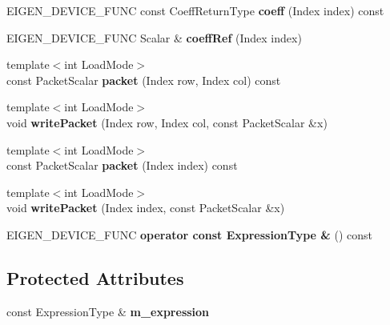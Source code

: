 \begin{DoxyCompactItemize}
E\+I\+G\+E\+N\+\_\+\+D\+E\+V\+I\+C\+E\+\_\+\+F\+U\+NC const Coeff\+Return\+Type {\bfseries coeff} (Index index) const
\item 
\mbox{\label{class_eigen_1_1_force_aligned_access_a9f9837d4b6dc5a266b2414d4fb1e3734}} 
E\+I\+G\+E\+N\+\_\+\+D\+E\+V\+I\+C\+E\+\_\+\+F\+U\+NC Scalar \& {\bfseries coeff\+Ref} (Index index)
\item 
\mbox{\label{class_eigen_1_1_force_aligned_access_a226e07b7136c99d39512d69e6ab2e543}} 
{\footnotesize template$<$int Load\+Mode$>$ }\\const Packet\+Scalar {\bfseries packet} (Index row, Index col) const
\item 
\mbox{\label{class_eigen_1_1_force_aligned_access_a33a9f296519b2df0c4df5ff2d95e2f7d}} 
{\footnotesize template$<$int Load\+Mode$>$ }\\void {\bfseries write\+Packet} (Index row, Index col, const Packet\+Scalar \&x)
\item 
\mbox{\label{class_eigen_1_1_force_aligned_access_a4d18db0f8749f29e9da0a2e73dc4156f}} 
{\footnotesize template$<$int Load\+Mode$>$ }\\const Packet\+Scalar {\bfseries packet} (Index index) const
\item 
\mbox{\label{class_eigen_1_1_force_aligned_access_a4312741489535e524aafca73e4268dae}} 
{\footnotesize template$<$int Load\+Mode$>$ }\\void {\bfseries write\+Packet} (Index index, const Packet\+Scalar \&x)
\item 
\mbox{\label{class_eigen_1_1_force_aligned_access_aecded324b795ce691d99000a70ddeecb}} 
E\+I\+G\+E\+N\+\_\+\+D\+E\+V\+I\+C\+E\+\_\+\+F\+U\+NC {\bfseries operator const Expression\+Type \&} () const
\end{DoxyCompactItemize}
\subsection*{Protected Attributes}
\begin{DoxyCompactItemize}
\item 
\mbox{\label{class_eigen_1_1_force_aligned_access_ab920b840c2c24e1fddf7ee8600dd7df7}} 
const Expression\+Type \& {\bfseries m\+\_\+expression}
\end{DoxyCompactItemize}


